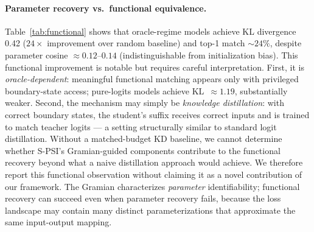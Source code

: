 \documentclass{article}
\begin{document}
\paragraph{Parameter recovery vs.\ functional equivalence.}
Table~\ref{tab:functional} shows that oracle-regime models achieve KL divergence 0.42 ($24\times$ improvement over random baseline) and top-1 match $\sim 24\%$, despite parameter cosine $\approx 0.12$--$0.14$ (indistinguishable from initialization bias).  This functional improvement is notable but requires careful interpretation.  First, it is \emph{oracle-dependent}: meaningful functional matching appears only with privileged boundary-state access; pure-logits models achieve KL~$\approx 1.19$, substantially weaker.  Second, the mechanism may simply be \emph{knowledge distillation}: with correct boundary states, the student's suffix receives correct inputs and is trained to match teacher logits --- a setting structurally similar to standard logit distillation.  Without a matched-budget KD baseline, we cannot determine whether S-PSI's Gramian-guided components contribute to the functional recovery beyond what a naive distillation approach would achieve.  We therefore report this functional observation without claiming it as a novel contribution of our framework.  The Gramian characterizes \emph{parameter} identifiability; functional recovery can succeed even when parameter recovery fails, because the loss landscape may contain many distinct parameterizations that approximate the same input-output mapping.
\end{document}

